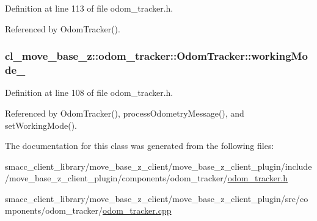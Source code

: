 Definition at line 113 of file odom\+\_\+tracker.\+h.



Referenced by Odom\+Tracker().

\subsubsection[{\texorpdfstring{working\+Mode\+\_\+}{workingMode_}}]{ cl\+\_\+move\+\_\+base\+\_\+z\+::odom\+\_\+tracker\+::\+Odom\+Tracker\+::working\+Mode\+\_\+\hspace{0.3cm}{\ttfamily [protected]}}\hypertarget{classcl__move__base__z_1_1odom__tracker_1_1OdomTracker_a5ae598c85c4469f4c0e984480575c42b}{}\label{classcl__move__base__z_1_1odom__tracker_1_1OdomTracker_a5ae598c85c4469f4c0e984480575c42b}


Definition at line 108 of file odom\+\_\+tracker.\+h.



Referenced by Odom\+Tracker(), process\+Odometry\+Message(), and set\+Working\+Mode().



The documentation for this class was generated from the following files\+:\begin{DoxyCompactItemize}
\item 
smacc\+\_\+client\+\_\+library/move\+\_\+base\+\_\+z\+\_\+client/move\+\_\+base\+\_\+z\+\_\+client\+\_\+plugin/include/move\+\_\+base\+\_\+z\+\_\+client\+\_\+plugin/components/odom\+\_\+tracker/\hyperlink{odom__tracker_8h}{odom\+\_\+tracker.\+h}\item 
smacc\+\_\+client\+\_\+library/move\+\_\+base\+\_\+z\+\_\+client/move\+\_\+base\+\_\+z\+\_\+client\+\_\+plugin/src/components/odom\+\_\+tracker/\hyperlink{odom__tracker_8cpp}{odom\+\_\+tracker.\+cpp}\end{DoxyCompactItemize}
